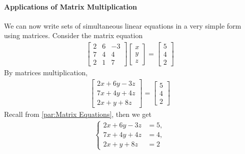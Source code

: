             \paragraph{Applications of Matrix Multiplication} %
            \label{par:Applications of Matrix Multiplication}
            We can now write sets of simultaneous linear equations in a very simple 
            form using matrices. Consider the matrix equation
            \begin{align}
                \label{matrices manipulation:1}
                \begin{bmatrix}
                    2 & 6 & -3 \\
                    7 & 4 & 4 \\
                    2 & 1 & 7
                \end{bmatrix}
                \begin{bmatrix}
                    x\\ y\\ z
                \end{bmatrix} = 
                \begin{bmatrix}
                    5 \\ 4 \\2
                \end{bmatrix}
            \end{align}
            By matrices multiplication,
            \begin{align}
                \label{matrices manipulation:2}
                \begin{bmatrix}
                    2x+6y-3z \\
                    7x+4y+4z \\
                    2x+y+8z
                \end{bmatrix} = 
                \begin{bmatrix}
                    5 \\ 4 \\2
                \end{bmatrix}
            \end{align}
            Recall from \eqref{par:Matrix Equations}, then we get
            \begin{align}
                \label{matrices manipulation:3}
                \begin{cases}
                    2x+6y-3z&=5,\\
                    7x+4y+4z&=4,\\
                    2x+y+8z&=2
                \end{cases}
            \end{align}
